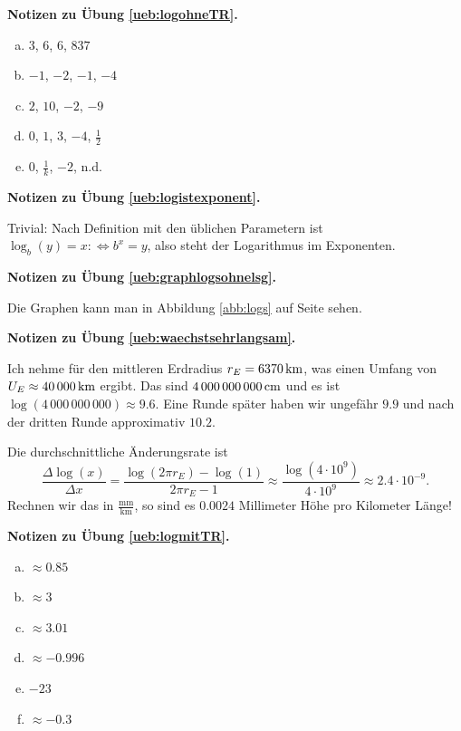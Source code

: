\documentclass[%
11pt,%
twoside,%
titlepage,%
swissgerman,%
headsepline%
]{scrartcl}
\newcommand{\faReturnGray}{\textcolor{gray}{\faMailReply}} %
\theoremstyle{definition}
\theoremstyle{plain}
\newcommand{\concatueb}[1]{ueb:#1}%
\newcommand{\concatlsg}[1]{lsg:#1}%
\newenvironment{lsg}[1]{%
    \par\noindent\textbf{Notizen zu Übung \ref{\concatueb{#1}}.}%
    \label{\concatlsg{#1}} %
    \hfill\hyperref[\concatueb{#1}]{\faReturnGray}\par %
}{%
    \par%
}
\begin{document}
\begin{lsg}{logohneTR}
    \begin{enumerate}[a)]
        \item $3$, $6$, $6$, $837$
        \item $-1$, $-2$, $-1$, $-4$
        \item $2$, $10$, $-2$, $-9$
        \item $0$, $1$, $3$, $-4$, $\frac{1}{2}$
        \item $0$, $\frac{1}{k}$, $-2$, n.d.
    \end{enumerate}
\end{lsg}
\begin{lsg}{logistexponent}
    Trivial: Nach Definition mit den üblichen Parametern ist $\log_b(y)=x :\Leftrightarrow b^x=y$, also steht der Logarithmus im Exponenten.
\end{lsg}

\begin{lsg}{graphlogsohnelsg}
   Die Graphen kann man in Abbildung \ref{abb:logs} auf Seite \pageref{abb:logs} sehen. 
\end{lsg}

\begin{lsg}{waechstsehrlangsam}
    Ich nehme für den mittleren Erdradius $r_E=\unit[6370]{km}$, was einen Umfang von $U_E\approx\unit[40\,000]{km}$ ergibt. Das sind $\unit[4\,000\,000\,000]{cm}$ und es ist $\log(4\,000\,000\,000)\approx9.6$. Eine Runde später haben wir ungefähr $9.9$ und nach der dritten Runde approximativ $10.2$.

    Die durchschnittliche Änderungsrate ist
    $$\frac{\Delta\log(x)}{\Delta x}=\frac{\log(2\pi r_E)-\log(1)}{2\pi r_E-1}\approx\frac{\log(4\cdot10^9)}{4\cdot10^9}\approx2.4\cdot10^{-9}.$$
    Rechnen wir das in $\frac{\mathrm{mm}}{\mathrm{km}}$, so sind es $0.0024$ Millimeter Höhe pro Kilometer Länge!
\end{lsg}

\begin{lsg}{logmitTR}
    \begin{enumerate}[a)]
        \item $\approx0.85$
        \item $\approx3$
        \item $\approx3.01$
        \item $\approx-0.996$
        \item $-23$
        \item $\approx-0.3$
    \end{enumerate}
\end{lsg}
\end{document}
